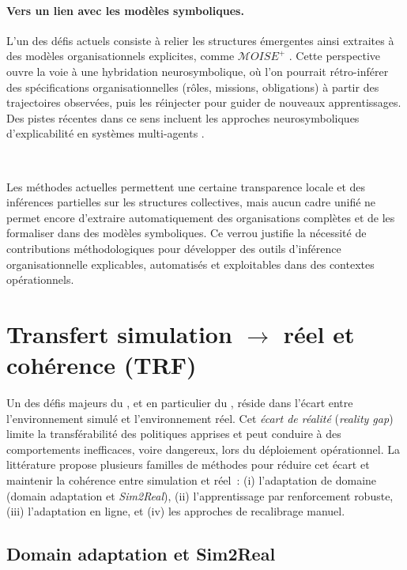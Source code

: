 \paragraph{Vers un lien avec les modèles symboliques.}
L’un des défis actuels consiste à relier les structures émergentes
ainsi extraites à des modèles organisationnels explicites,
comme $\mathcal{M}OISE^+$ \cite{hubner2007using}.
Cette perspective ouvre la voie à une hybridation neurosymbolique,
où l’on pourrait rétro-inférer des spécifications organisationnelles
(rôles, missions, obligations) à partir des trajectoires observées,
puis les réinjecter pour guider de nouveaux apprentissages.
Des pistes récentes dans ce sens incluent les approches neurosymboliques
d’explicabilité en systèmes multi-agents \cite{subramanian2024neurosymbolic}.

\

Les méthodes actuelles permettent une certaine transparence locale
et des inférences partielles sur les structures collectives,
mais aucun cadre unifié ne permet encore
d’extraire automatiquement des organisations complètes
et de les formaliser dans des modèles symboliques.
Ce verrou justifie la nécessité de contributions méthodologiques
pour développer des outils d’inférence organisationnelle
explicables, automatisés et exploitables dans des contextes opérationnels.

\section{Transfert simulation $\rightarrow$ réel et cohérence (TRF)}

\noindent
Un des défis majeurs du , et en particulier du , réside dans l’écart
entre l’environnement simulé et l’environnement réel. Cet \textit{écart de réalité}
(\textit{reality gap}) limite la transférabilité des politiques apprises et
peut conduire à des comportements inefficaces, voire dangereux,
lors du déploiement opérationnel. La littérature propose plusieurs familles de méthodes
pour réduire cet écart et maintenir la cohérence entre simulation et réel~:
(i) l’adaptation de domaine (domain adaptation et \textit{Sim2Real}),
(ii) l’apprentissage par renforcement robuste,
(iii) l’adaptation en ligne, et
(iv) les approches de recalibrage manuel.

\subsection{Domain adaptation et Sim2Real}

